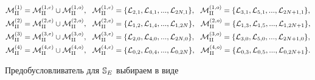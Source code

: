 \begin{equation} \label{sideren}


\begin{split}


{\cal M}^{(1)}_{\rii}&={\cal M}^{(1,e)}_{\rii}


\cup{\cal M}^{(1,o)}_{\rii},\ \ {\cal


M}^{(1,e)}_{\rii}=\{ {\cal L}_{2,1}, {\cal L}_{4,1}, ...,


{\cal L}_{2N,1}\},\ \ {\cal M}^{(1,o)}_{\rii}=


\{ {\cal L}_{3,1}, {\cal L}_{5,1}, ...,


{\cal L}_{2N+1,1}\},\\


%


{\cal M}^{(2)}_{\rii}&={\cal M}^{(2,e)}_{\rii}


\cup{\cal M}^{(2,o)}_{\rii},\ \ {\cal


M}^{(2,e)}_{\rii}=\{ {\cal L}_{1,2}, {\cal L}_{1,4}, ...,


{\cal L}_{1,2N}\},\ \ {\cal M}^{(2,o)}_{\rii}=


\{ {\cal L}_{1,3}, {\cal L}_{1,5}, ...,{\cal L}_{1,2N+1}\},\\


%


{\cal M}^{(3)}_{\rii}&={\cal M}^{(3,e)}_{\rii}\cup


{\cal M}^{(3,o)}_{\rii},\ \ {\cal M}^{(3,e)}_{\rii}=


\{ {\cal L}_{2,0}, {\cal L}_{4,0}, ..., {\cal L}_{2N,0}\}, 


\ \ {\cal M}^{(3,o)}_{\rii}=\{ {\cal L}_{3,0}, {\cal L}_{5,0}, ...,


{\cal L}_{2N+1,0}\},\\


%


{\cal M}^{(4)}_{\rii}&={\cal M}^{(4,e)}_{\rii}


\cup{\cal M}^{(4,o)}_{\rii},\ \ {\cal M}^{(4,e)}_{\rii}=


\{ {\cal L}_{0,2}, {\cal L}_{0,4}, ..., {\cal L}_{0,2N}\}, 


\ \ {\cal M}^{(4,o)}_{\rii}=\{ {\cal L}_{0,3}, {\cal L}_{0,5}, ...,


{\cal L}_{0,2N+1}\}.


\end{split}


\end{equation}


Предобусловливатель для $\Bbb{S}_E$ выбираем в виде 


